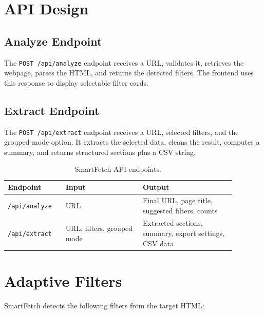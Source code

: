 \documentclass[11pt,a4paper]{article}
\newcommand{\tech}[1]{\texttt{#1}}
\begin{document}
\section{API Design}

\subsection{Analyze Endpoint}

The \tech{POST /api/analyze} endpoint receives a URL, validates it, retrieves the webpage, parses the HTML, and returns the detected filters. The frontend uses this response to display selectable filter cards.

\subsection{Extract Endpoint}

The \tech{POST /api/extract} endpoint receives a URL, selected filters, and the grouped-mode option. It extracts the selected data, cleans the result, computes a summary, and returns structured sections plus a CSV string.

\begin{table}[h]
\centering
\begin{tabular}{p{0.22\linewidth}p{0.30\linewidth}p{0.36\linewidth}}
\toprule
\textbf{Endpoint} & \textbf{Input} & \textbf{Output} \\
\midrule
\tech{/api/analyze} & URL & Final URL, page title, suggested filters, counts \\
\tech{/api/extract} & URL, filters, grouped mode & Extracted sections, summary, export settings, CSV data \\
\bottomrule
\end{tabular}
\caption{SmartFetch API endpoints.}
\end{table}

\section{Adaptive Filters}

SmartFetch detects the following filters from the target HTML:
\end{document}
